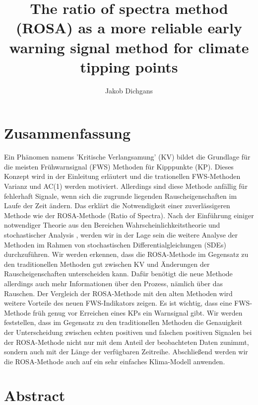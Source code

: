 \documentclass[%
thesis=student,%
coverpage=false,%
titlepage=false,%
headmarks=true, %
english,%
font=libertine, %
math=newpxtx, %
BCOR=5mm,%
coverBCOR=11mm%
]{tumbook}
\title{The ratio of spectra method (ROSA) as a more reliable early warning signal method for climate tipping points}
\author{Jakob Dichgans}
\begin{document}
\frontmatter
\maketitle

\section*{Zusammenfassung}


Ein Phänomen namens 'Kritische Verlangsamung' (KV) bildet die Grundlage für die meisten Frühwarnsignal (FWS) Methoden für Kipppunkte (KP). Dieses Konzept wird in der Einleitung erläutert und die trationellen FWS-Methoden Varianz und AC(1) werden motiviert. Allerdings sind diese Methode anfällig für fehlerhaft Signale, wenn sich die zugrunde liegenden Rauscheigenschaften im Laufe der Zeit ändern. Das erklärt die Notwendigkeit einer zuverlässigeren Methode wie der ROSA-Methode (Ratio of Spectra). Nach der Einführung einiger notwendiger Theorie aus den Bereichen Wahrscheinlichkeitstheorie und stochastischer Analysis , werden wir in der Lage sein die weitere Analyse der Methoden im Rahmen von stochastischen Differentialgleichungen (SDEs) durchzuführen. Wir werden erkennen, dass die ROSA-Methode im Gegensatz zu den traditionellen Methoden gut zwischen KV und Änderungen der Rauscheigenschaften unterscheiden kann. Dafür benötigt die neue Methode allerdings auch mehr Informationen über den Prozess, nämlich über das Rauschen. Der Vergleich der ROSA-Methode mit den alten Methoden wird weitere Vorteile des neuen FWS-Indikators zeigen. Es ist wichtig, dass eine FWS-Methode früh genug vor Erreichen eines KPs ein Warnsignal gibt. Wir werden feststellen, dass im Gegensatz zu den traditionellen Methoden die Genauigkeit der Unterscheidung zwischen echten positiven und falschen positiven Signalen bei der ROSA-Methode nicht nur mit dem Anteil der beobachteten Daten zunimmt, sondern auch mit der Länge der verfügbaren Zeitreihe. Abschließend werden wir die ROSA-Methode auch auf ein sehr einfaches Klima-Modell anwenden.


\section*{Abstract}
\end{document}
